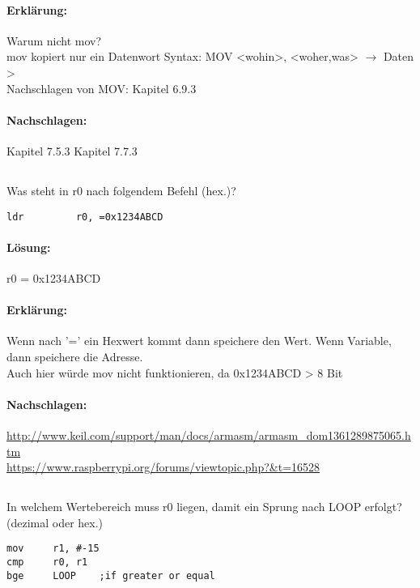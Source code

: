 \paragraph*{Erklärung:}
Warum nicht mov?\\
mov kopiert nur ein Datenwort Syntax: MOV <wohin>, <woher,was> $\rightarrow$ Daten > \\
Nachschlagen von MOV: Kapitel 6.9.3\\
\paragraph*{Nachschlagen:}
Kapitel 7.5.3
Kapitel 7.7.3


\subsection{}
Was steht in r0 nach folgendem Befehl (hex.)?
\begin{lstlisting}
ldr 		r0, =0x1234ABCD
\end{lstlisting}


\paragraph*{Lösung:}
r0 = 0x1234ABCD

\paragraph*{Erklärung:} 
Wenn nach '=' ein Hexwert kommt dann speichere den Wert. Wenn Variable, dann speichere die Adresse.\\
Auch hier würde mov nicht funktionieren, da 0x1234ABCD > 8 Bit\\


\paragraph*{Nachschlagen:}
\url{http://www.keil.com/support/man/docs/armasm/armasm_dom1361289875065.htm} \\
\url{https://www.raspberrypi.org/forums/viewtopic.php?&t=16528}

\subsection{}
In welchem Wertebereich muss r0 liegen, damit ein Sprung nach LOOP erfolgt? (dezimal oder hex.)
\begin{lstlisting}
mov		r1, #-15
cmp		r0, r1
bge		LOOP	;if greater or equal
\end{lstlisting}

